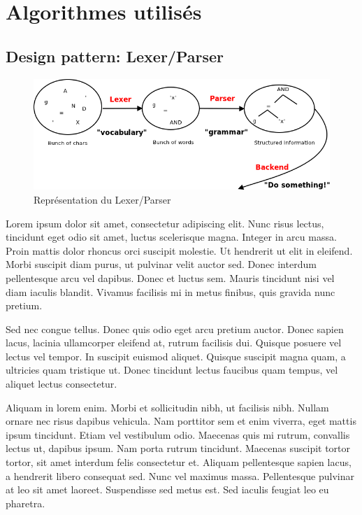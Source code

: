 \documentclass{report}
\begin{document}
    \chapter{Algorithmes utilisés}
        \section{Design pattern: Lexer/Parser}
            \begin{figure}[h]
                \begin{center}
                    \includegraphics[scale=0.6]{./assets/lexer_parser.png}
                \end{center}

                \caption{Représentation du Lexer/Parser}
                \label{Représentation du Lexer/Parser}
            \end{figure}

            Lorem ipsum dolor sit amet, consectetur adipiscing elit. Nunc risus lectus, tincidunt eget odio sit amet, luctus scelerisque magna. Integer in arcu massa. Proin mattis dolor rhoncus orci suscipit molestie. Ut hendrerit ut elit in eleifend. Morbi suscipit diam purus, ut pulvinar velit auctor sed. Donec interdum pellentesque arcu vel dapibus. Donec et luctus sem. Mauris tincidunt nisi vel diam iaculis blandit. Vivamus facilisis mi in metus finibus, quis gravida nunc pretium.

            Sed nec congue tellus. Donec quis odio eget arcu pretium auctor. Donec sapien lacus, lacinia ullamcorper eleifend at, rutrum facilisis dui. Quisque posuere vel lectus vel tempor. In suscipit euismod aliquet. Quisque suscipit magna quam, a ultricies quam tristique ut. Donec tincidunt lectus faucibus quam tempus, vel aliquet lectus consectetur.

            Aliquam in lorem enim. Morbi et sollicitudin nibh, ut facilisis nibh. Nullam ornare nec risus dapibus vehicula. Nam porttitor sem et enim viverra, eget mattis ipsum tincidunt. Etiam vel vestibulum odio. Maecenas quis mi rutrum, convallis lectus ut, dapibus ipsum. Nam porta rutrum tincidunt. Maecenas suscipit tortor tortor, sit amet interdum felis consectetur et. Aliquam pellentesque sapien lacus, a hendrerit libero consequat sed. Nunc vel maximus massa. Pellentesque pulvinar at leo sit amet laoreet. Suspendisse sed metus est. Sed iaculis feugiat leo eu pharetra.
\end{document}
